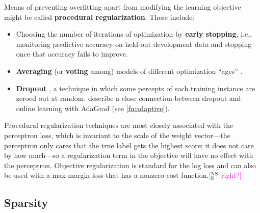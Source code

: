 \documentclass[11pt,letterpaper]{article}
\newcommand{\ensuretext}[1]{#1}
\newcommand{\nssmarker}{\ensuretext{\textcolor{magenta}{\ensuremath{^{\textsc{NS}}_{\textsc{S}}}}}}
\newcommand{\arkcomment}[3]{\ensuretext{\textcolor{#3}{[#1 #2]}}}
\newcommand{\nss}[1]{\arkcomment{\nssmarker}{#1}{magenta}}
\newcommand{\fnref}[1]{\autoref{#1}} %
\begin{document}
Means of preventing overfitting apart from modifying the learning objective might be called \textbf{procedural regularization}. 
These include:
\begin{itemize}
  \item Choosing the number of iterations of optimization by \textbf{early stopping}, i.e., 
  monitoring predictive accuracy on held-out development data and stopping once that accuracy fails to improve.
  \item \textbf{Averaging} (or \textbf{voting} among) models of different optimization ``ages'' \citep{freund-99}.
  \item \textbf{Dropout} \citep{hinton-12,baldi-13}, a technique in which some percepts of each training instance are zeroed out 
  at random. \citet{wager-13} describe a close connection between dropout and online learning with AdaGrad (see \fnref{fn:adaptive}).
\end{itemize}

Procedural regularization techniques are most closely associated with the perceptron loss, 
which is invariant to the scale of the weight vector---the perceptron only cares that the true label gets the highest score; 
it does not care by how much---so a regularization term in the objective will have no effect with the perceptron.
Objective regularization is standard for the log loss 
and can also be used with a max-margin loss that has a nonzero cost function.\nss{right?}

\subsection{Sparsity}\label{sec:sparsity}
\end{document}
